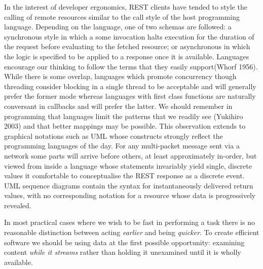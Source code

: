 \documentclass[]{article}
\begin{document}
In the interest of developer ergonomics, REST clients have tended to
style the calling of remote resources similar to the call style of the
host programming language. Depending on the language, one of two schemas
are followed: a synchronous style in which a some invocation halts
execution for the duration of the request before evaluating to the
fetched resource; or asynchronous in which the logic is specified to be
applied to a response once it is available. Languages encourage our
thinking to follow the terms that they easily support(Whorf 1956). While
there is some overlap, languages which promote concurrency though
threading consider blocking in a single thread to be acceptable and will
generally prefer the former mode whereas languages with first class
functions are naturally conversant in callbacks and will prefer the
latter. We should remember in programming that languages limit the
patterns that we readily see (Yukihiro 2003) and that better mappings
may be possible. This observation extends to graphical notations such as
UML whose constructs strongly reflect the programming languages of the
day. For any multi-packet message sent via a network some parts will
arrive before others, at least approximately in-order, but viewed from
inside a language whose statements invariably yield single, discrete
values it comfortable to conceptualise the REST response as a discrete
event. UML sequence diagrams contain the syntax for instantaneously
delivered return values, with no corresponding notation for a resource
whose data is progressively revealed.

In most practical cases where we wish to be fast in performing a task
there is no reasonable distinction between acting \emph{earlier} and
being \emph{quicker}. To create efficient software we should be using
data at the first possible opportunity: examining content \emph{while it
streams} rather than holding it unexamined until it is wholly available.
\end{document}

